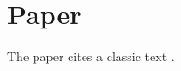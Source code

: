 \documentclass{article}
\begin{document}
\section{Paper}
The paper cites a classic text \cite{goldstein2002}.



\end{document}
